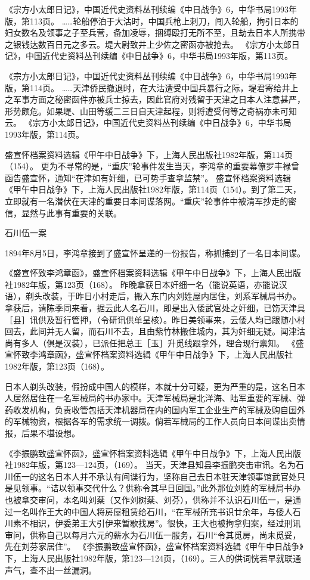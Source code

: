 \documentclass[12pt,UTF8]{ctexbook}
\begin{document}
《宗方小太郎日记》，中国近代史资料丛刊续编《中日战争》6，中华书局1993年版，第113页。
……轮船停泊于大沽时，中国兵枪上刺刀，闯入轮船，拘引日本的妇女数名及领事之子至兵营，备加凌辱，捆缚殴打无所不至，且劫去日本人所携带之银钱达数百日元之多云。堤大尉致井上少佐之密函亦被抢去。 《宗方小太郎日记》，中国近代史资料丛刊续编《中日战争》6，中华书局1993年版，第113页。

《宗方小太郎日记》，中国近代史资料丛刊续编《中日战争》6，中华书局1993年版，第114页。
……天津侨民撤退时，在大沽遭受中国兵暴行之际，堤君寄给井上之军事方面之秘密函件亦被兵士掠去，因此官府对残留于天津之日本人注意甚严，形势颇危。如果堤、山田等缓二三日自天津起程，则将遭受何等之奇祸亦未可知云。 《宗方小太郎日记》，中国近代史资料丛刊续编《中日战争》6，中华书局1993年版，第114页。

盛宣怀档案资料选辑《甲午中日战争》下，上海人民出版社1982年版，第114页（154）。
更为不寻常的是，“重庆”轮事件发生当天，李鸿章的重要幕僚罗丰禄曾函告盛宣怀，通知“在津如有奸细，已可势手查拿监禁”。 盛宣怀档案资料选辑《甲午中日战争》下，上海人民出版社1982年版，第114页（154）。到了第二天，立即就有一名潜伏在天津的重要日本间谍落网。“重庆”轮事件中被清军抄走的密信，显然与此事有重要的关联。

石川伍一案

1894年8月5日，李鸿章接到了盛宣怀呈递的一份报告，称抓捕到了一名日本间谍。

《盛宣怀致李鸿章函》，盛宣怀档案资料选辑《甲午中日战争》下，上海人民出版社1982年版，第123页（168）。
昨晚拿获日本奸细一名（能说英语，亦能说汉语），剃头改装，于昨日小村走后，搬入东门内刘姓屋内居住，刘系军械局书办。拿获后，请陈季同来看，据云此人名石川，即是出入倭武官处之奸细，已饬天津具［县］讯供及暂行管押，（令研讯供单呈核）。昨日美领事来，云倭人均已跟随小村回去，此间并无人留，而石川不去，且由紫竹林搬住城内，其为奸细无疑。闻津沽尚有多人（俱是汉装），已派任把总王［玉］升觅线跟拿外，理合现行禀知。 《盛宣怀致李鸿章函》，盛宣怀档案资料选辑《甲午中日战争》下，上海人民出版社1982年版，第123页（168）。

日本人剃头改装，假扮成中国人的模样，本就十分可疑，更为严重的是，这名日本人居然居住在一名军械局的书办家中。天津军械局是北洋海、陆军重要的军械、弹药收发机构，负责收管包括天津机器局在内的国内军工企业生产的军械及购自国外的军械物资，根据各军的需求统一调拨。倘若军械局的工作人员向日本间谍出卖情报，后果不堪设想。

《李振鹏致盛宣怀函》，盛宣怀档案资料选辑《甲午中日战争》下，上海人民出版社1982年版，第123—124页，（169）。
当天，天津县知县李振鹏突击审讯。名为石川伍一的这名日本人并不承认有间谍行为，坚称自己去日本驻天津领事馆武官处只是见领事。“诘以领事交代什么？供称令其早日回国。”此外那位刘姓的军械局书办也被拿交审问，本名叫刘棻（又作刘树棻、刘芬），供称并不认识石川伍一，是通过一名叫作王大的中国人将房屋租赁给石川，“在军械所充书识廿余年，与倭人石川素不相识，伊委弟王大引伊来暂歇找房”。很快，王大也被拘拿归案，经过刑讯审问，供称自己以每月六元的薪水为石川伍一服务，石川“令其觅房，尚未觅妥，先在刘芬家居住”。 《李振鹏致盛宣怀函》，盛宣怀档案资料选辑《甲午中日战争》下，上海人民出版社1982年版，第123—124页，（169）。三人的供词恍若早就联通声气，查不出一丝漏洞。
\end{document}
